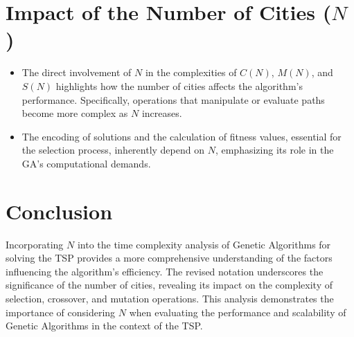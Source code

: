 \documentclass{article}
\begin{document}
	\section{Impact of the Number of Cities (\(N\))}
	\begin{itemize}
		\item The direct involvement of \(N\) in the complexities of \(C(N)\), \(M(N)\), and \(S(N)\) highlights how the number of cities affects the algorithm's performance. Specifically, operations that manipulate or evaluate paths become more complex as \(N\) increases.
		\item The encoding of solutions and the calculation of fitness values, essential for the selection process, inherently depend on \(N\), emphasizing its role in the GA's computational demands.
	\end{itemize}
	
	\section{Conclusion}
	Incorporating \(N\) into the time complexity analysis of Genetic Algorithms for solving the TSP provides a more comprehensive understanding of the factors influencing the algorithm's efficiency. The revised notation underscores the significance of the number of cities, revealing its impact on the complexity of selection, crossover, and mutation operations. This analysis demonstrates the importance of considering \(N\) when evaluating the performance and scalability of Genetic Algorithms in the context of the TSP.
	
\end{document}
